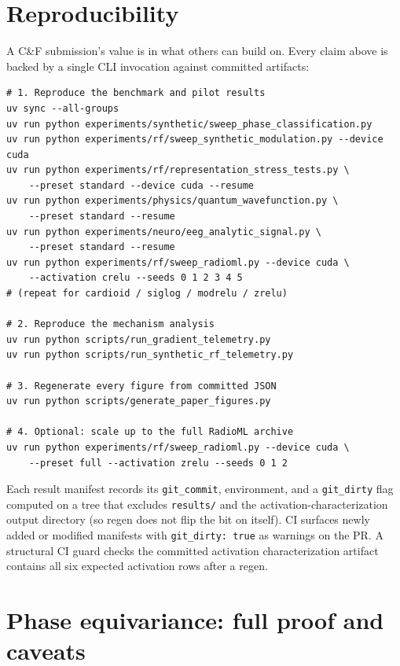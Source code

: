 \documentclass{article}
\newcommand{\code}[1]{\texttt{#1}}
\begin{document}
\section{Reproducibility}
\label{sec:reproducibility}

A C\&F submission's value is in what others can build on. Every claim
above is backed by a single CLI invocation against committed
artifacts:

\begin{verbatim}
# 1. Reproduce the benchmark and pilot results
uv sync --all-groups
uv run python experiments/synthetic/sweep_phase_classification.py
uv run python experiments/rf/sweep_synthetic_modulation.py --device cuda
uv run python experiments/rf/representation_stress_tests.py \
    --preset standard --device cuda --resume
uv run python experiments/physics/quantum_wavefunction.py \
    --preset standard --resume
uv run python experiments/neuro/eeg_analytic_signal.py \
    --preset standard --resume
uv run python experiments/rf/sweep_radioml.py --device cuda \
    --activation crelu --seeds 0 1 2 3 4 5
# (repeat for cardioid / siglog / modrelu / zrelu)

# 2. Reproduce the mechanism analysis
uv run python scripts/run_gradient_telemetry.py
uv run python scripts/run_synthetic_rf_telemetry.py

# 3. Regenerate every figure from committed JSON
uv run python scripts/generate_paper_figures.py

# 4. Optional: scale up to the full RadioML archive
uv run python experiments/rf/sweep_radioml.py --device cuda \
    --preset full --activation zrelu --seeds 0 1 2
\end{verbatim}

Each result manifest records its \code{git\_commit}, environment, and
a \code{git\_dirty} flag computed on a tree that excludes
\code{results/} and the activation-characterization output directory
(so regen does not flip the bit on itself). CI surfaces newly added or
modified manifests with \code{git\_dirty: true} as warnings on the PR.
A structural CI guard checks the committed activation
characterization artifact contains all six expected activation rows
after a regen.




\clearpage
\appendix

\section{Phase equivariance: full proof and caveats}
\label{app:phase-equivariance}
\end{document}

